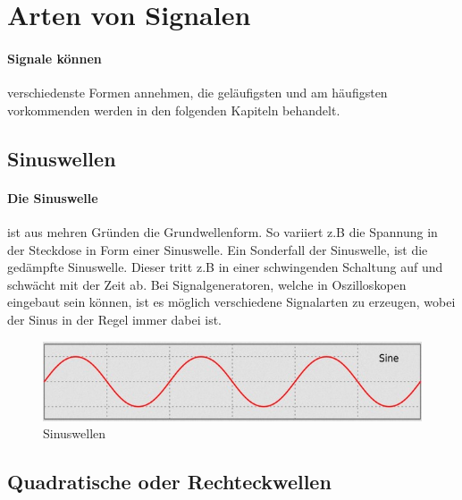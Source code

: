 \documentclass{article}
\begin{document}
\section{Arten von Signalen}
\paragraph{Signale können}
verschiedenste Formen annehmen, die geläufigsten und am häufigsten vorkommenden werden in den folgenden Kapiteln behandelt.
\subsection{Sinuswellen}
\paragraph{Die Sinuswelle}
ist aus mehren Gründen die Grundwellenform. So variiert z.B die Spannung in der Steckdose in Form einer Sinuswelle. Ein Sonderfall der Sinuswelle, ist die gedämpfte Sinuswelle. Dieser tritt z.B in einer schwingenden Schaltung auf und schwächt mit der Zeit ab. Bei Signalgeneratoren, welche in Oszilloskopen eingebaut sein können, ist es möglich verschiedene Signalarten zu erzeugen, wobei der Sinus in der Regel immer dabei ist.\cite{basics}

\begin{figure}[H]
  \includegraphics[width=\textwidth]{"Sinuswellen"}
  \caption[\textbf{Sinuswellen.jpg},  Quelle:https://en.wikipedia.org/wiki/Waveform (zuletzt abgerufen: 04.09.2021)]{Sinuswellen}
\end{figure}
\newline

\subsection{Quadratische oder Rechteckwellen}
\end{document}
